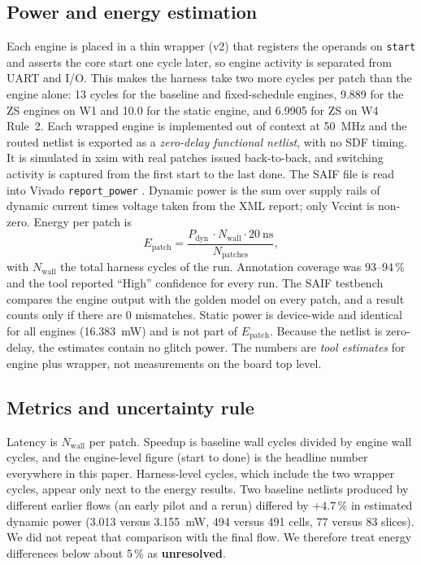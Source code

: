\documentclass[11pt,journal,draftclsnofoot,onecolumn]{IEEEtran}
\begin{document}
\subsection{Power and energy estimation}\label{sec:m-power}
Each engine is placed in a thin wrapper (v2) that registers the operands on \texttt{start}
and asserts the core start one cycle later, so engine activity is separated from UART and
I/O. This makes the harness take two more cycles per patch than the engine alone: 13
cycles for the baseline and fixed-schedule engines, 9.889 for the ZS engines on W1 and
10.0 for the static engine, and 6.9905 for ZS on W4 Rule~2. Each wrapped engine is
implemented out of context at 50~MHz and the routed netlist is exported as a
\emph{zero-delay functional netlist}, with no SDF timing. It is simulated in xsim with
real patches issued back-to-back, and switching activity is captured from the first start
to the last done. The SAIF file is read into Vivado \texttt{report\_power}
\cite{ug907}. Dynamic power is the sum over supply rails of dynamic current times
voltage taken from the XML report; only Vccint is non-zero. Energy per patch is
\begin{equation}
E_{\mathrm{patch}}=\frac{P_{\mathrm{dyn}}\,\cdot N_{\mathrm{wall}}\cdot 20\ \mathrm{ns}}{N_{\mathrm{patches}}},
\end{equation}
with $N_{\mathrm{wall}}$ the total harness cycles of the run. Annotation coverage was
93--94\,\% and the tool reported ``High'' confidence for every run. The SAIF testbench
compares the engine output with the golden model on every patch, and a result counts only
if there are 0 mismatches. Static power is device-wide and identical for all engines
(16.383~mW) and is not part of $E_{\mathrm{patch}}$. Because the netlist is zero-delay,
the estimates contain no glitch power. The numbers are \emph{tool estimates} for
engine plus wrapper, not measurements on the board top level.

\subsection{Metrics and uncertainty rule}\label{sec:m-metrics}
Latency is $N_{\mathrm{wall}}$ per patch. Speedup is baseline wall cycles divided by
engine wall cycles, and the engine-level figure (start to done) is the headline number
everywhere in this paper. Harness-level cycles, which include the two wrapper cycles,
appear only next to the energy results. Two baseline netlists produced by different
earlier flows (an early pilot and a rerun) differed by $+4.7$\,\% in estimated dynamic
power (3.013 versus 3.155~mW, 494 versus 491 cells, 77 versus 83 slices). We did not
repeat that comparison with the final flow. We therefore treat energy differences below
about 5\,\% as \textbf{unresolved}.
\end{document}
